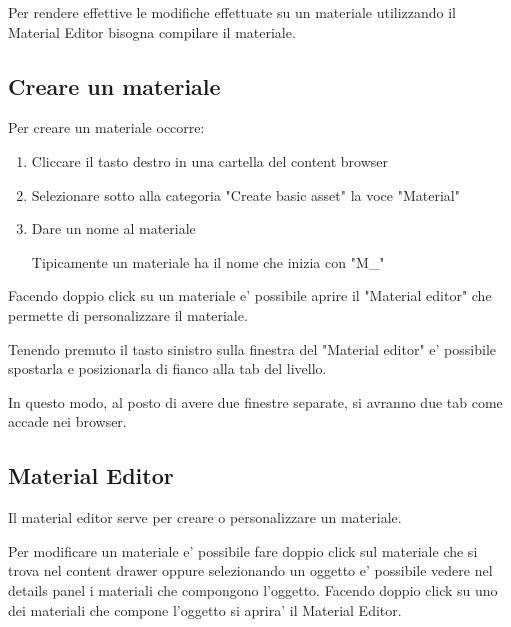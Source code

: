             \begin{notebox}
                Per rendere effettive le modifiche effettuate su un materiale utilizzando il Material Editor bisogna compilare il materiale.
            \end{notebox}

        \subsection{Creare un materiale}

            Per creare un materiale occorre:
            \begin{enumerate}
                \item Cliccare il tasto destro in una cartella del content browser
                \item Selezionare sotto alla categoria "Create basic asset" la voce "Material"
                \item Dare un nome al materiale

                    \begin{notebox}
                        Tipicamente un materiale ha il nome che inizia con "M\_"
                    \end{notebox}

            \end{enumerate}

            Facendo doppio click su un materiale e' possibile aprire il "Material editor" che permette di personalizzare il materiale.

            \begin{notebox}
                Tenendo premuto il tasto sinistro sulla finestra del "Material editor" e' possibile spostarla e posizionarla di fianco alla tab del livello.

                In questo modo, al posto di avere due finestre separate, si avranno due tab come accade nei browser.
            \end{notebox}

        \subsection{Material Editor}

            Il material editor serve per creare o personalizzare un materiale.

            Per modificare un materiale e' possibile fare doppio click sul materiale che si trova nel content drawer oppure selezionando un oggetto e' possibile vedere nel details panel i materiali che compongono l'oggetto. Facendo doppio click su uno dei materiali che compone l'oggetto si aprira' il Material Editor.

